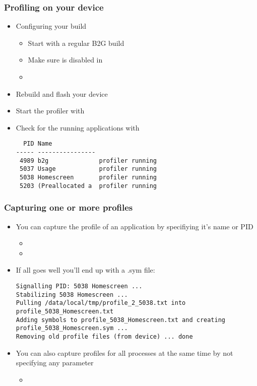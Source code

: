 \begin{frame}[fragile]
 \frametitle{Profiling on your device}
 \begin{itemize}
  \item Configuring your build
   \begin{itemize}
    \item Start with a regular B2G build
    \item Make sure  is disabled in 
    \item {}
   \end{itemize}
  \item Rebuild and flash your device
  \item Start the profiler with 
  \item Check for the running applications with 
   \begin{Verbatim}
  PID Name
----- ----------------
 4989 b2g              profiler running
 5037 Usage            profiler running
 5038 Homescreen       profiler running
 5203 (Preallocated a  profiler running
   \end{Verbatim}
 \end{itemize}
\end{frame}

\begin{frame}[fragile]
 \frametitle{Capturing one or more profiles}
 \begin{itemize}
  \item You can capture the profile of an application by specifiying it's name or PID
   \begin{itemize}
    \item {}
    \item {}
   \end{itemize}
  \item If all goes well you'll end up with a .sym file:
   \begin{Verbatim}
Signalling PID: 5038 Homescreen ...
Stabilizing 5038 Homescreen ...
Pulling /data/local/tmp/profile_2_5038.txt into profile_5038_Homescreen.txt
Adding symbols to profile_5038_Homescreen.txt and creating profile_5038_Homescreen.sym ...
Removing old profile files (from device) ... done
   \end{Verbatim}
  \item You can also capture profiles for all processes at the same time by not specifying any parameter
  \begin{itemize}
   \item {}
  \end{itemize}
 \end{itemize}
\end{frame}

